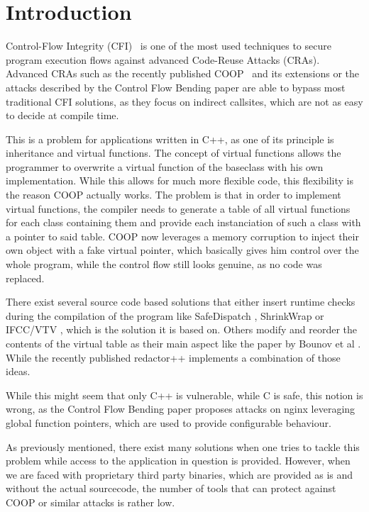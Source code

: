 \chapter{Introduction}
\label{chapter:Introduction}
Control-Flow Integrity (CFI)~\cite{abadi:cfi2, abadi:cfi} is one of the most used techniques to secure program execution flows against advanced Code-Reuse Attacks (CRAs).
Advanced CRAs such as the recently published COOP~\cite{schuster:coop} and its extensions \cite{crane:readactor++} or the attacks described by the Control Flow Bending paper \cite{carlini:bending} are able to bypass most traditional CFI solutions, as they focus on indirect callsites, which are not as easy to decide at compile time.

This is a problem for applications written in C++, as one of its principle is inheritance and virtual functions. The concept of virtual functions allows the programmer to overwrite a virtual function of the baseclass with his own implementation. While this allows for much more flexible code, this flexibility is the reason COOP actually works. The problem is that in order to implement virtual functions, the compiler needs to generate a table of all virtual functions for each class containing them and provide each instanciation of such a class with a pointer to said table. COOP now leverages a memory corruption to inject their own object with a fake virtual pointer, which basically gives him control over the whole program, while the control flow still looks genuine, as no code was replaced. 

There exist several source code based solutions that either insert runtime checks during the compilation of the program like SafeDispatch \cite{safedispatch:jang}, ShrinkWrap \cite{haller:shrinkwrap} or IFCC/VTV \cite{vtv:tice}, which is the solution it is based on. Others modify and reorder the contents of the virtual table as their main aspect like the paper by Bounov et al \cite{bounov:interleaving}. While the recently published redactor++ \cite{crane:readactor++} implements a combination of those ideas.

While this might seem that only C++ is vulnerable, while C is safe, this notion is wrong, as the Control Flow Bending paper \cite{carlini:bending} proposes attacks on nginx leveraging global function pointers, which are used to provide configurable behaviour.

As previously mentioned, there exist many solutions when one tries to tackle this problem while access to the application in question is provided. However, when we are faced with proprietary third party binaries, which are provided as is and without the actual sourcecode, the number of tools that can protect against COOP or similar attacks is rather low.

